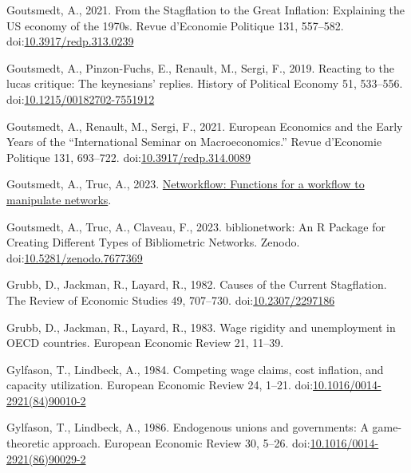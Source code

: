 \documentclass[
  12pt,
  onecolumn]{article}
\newlength{\cslhangindent}
\newlength{\cslentryspacingunit} %
\newenvironment{CSLReferences}[2] %
 {%
  \setlength{\parindent}{0pt}
  \ifodd #1
  \let\oldpar\par
  \def\par{\hangindent=\cslhangindent\oldpar}
  \fi
  \setlength{\parskip}{#2\cslentryspacingunit}
 }%
 {}
\begin{document}
\begin{CSLReferences}{1}{0}
\leavevmode{}%
Goutsmedt, A., 2021. From the {Stagflation} to the {Great Inflation}: {Explaining} the {US} economy of the 1970s. Revue d'Economie Politique 131, 557--582. doi:\href{https://doi.org/10.3917/redp.313.0239}{10.3917/redp.313.0239}

\leavevmode{}%
Goutsmedt, A., Pinzon-Fuchs, E., Renault, M., Sergi, F., 2019. Reacting to the lucas critique: {The} keynesians' replies. History of Political Economy 51, 533--556. doi:\href{https://doi.org/10.1215/00182702-7551912}{10.1215/00182702-7551912}

\leavevmode{}%
Goutsmedt, A., Renault, M., Sergi, F., 2021. European {Economics} and the {Early Years} of the {``{International Seminar} on {Macroeconomics}.''} Revue d'Economie Politique 131, 693--722. doi:\href{https://doi.org/10.3917/redp.314.0089}{10.3917/redp.314.0089}

\leavevmode{}%
Goutsmedt, A., Truc, A., 2023. \href{https://agoutsmedt.github.io/networkflow/}{Networkflow: Functions for a workflow to manipulate networks}.

\leavevmode{}%
Goutsmedt, A., Truc, A., Claveau, F., 2023. {biblionetwork: An R Package for Creating Different Types of Bibliometric Networks}. Zenodo. doi:\href{https://doi.org/10.5281/zenodo.7677369}{10.5281/zenodo.7677369}

\leavevmode{}%
Grubb, D., Jackman, R., Layard, R., 1982. Causes of the {Current Stagflation}. The Review of Economic Studies 49, 707--730. doi:\href{https://doi.org/10.2307/2297186}{10.2307/2297186}

\leavevmode{}%
Grubb, D., Jackman, R., Layard, R., 1983. Wage rigidity and unemployment in {OECD} countries. European Economic Review 21, 11--39.

\leavevmode{}%
Gylfason, T., Lindbeck, A., 1984. Competing wage claims, cost inflation, and capacity utilization. European Economic Review 24, 1--21. doi:\href{https://doi.org/10.1016/0014-2921(84)90010-2}{10.1016/0014-2921(84)90010-2}

\leavevmode{}%
Gylfason, T., Lindbeck, A., 1986. Endogenous unions and governments: {A} game-theoretic approach. European Economic Review 30, 5--26. doi:\href{https://doi.org/10.1016/0014-2921(86)90029-2}{10.1016/0014-2921(86)90029-2}


\end{CSLReferences}
\end{document}

